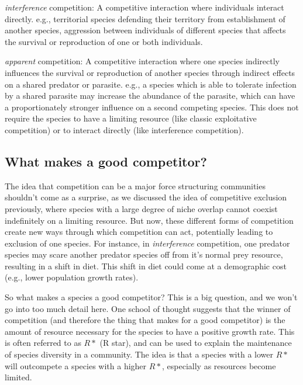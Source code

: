 \documentclass[12pt]{article}
\begin{document}
\textit{interference} competition: A competitive interaction where individuals interact directly. e.g., territorial species defending their territory from establishment of another species, aggression between individuals of different species that affects the survival or reproduction of one or both individuals. 


\textit{apparent} competition: A competitive interaction where one species indirectly influences the survival or reproduction of another species through indirect effects on a shared predator or parasite. e.g., a species which is able to tolerate infection by a shared parasite may increase the abundance of the parasite, which can have a proportionately stronger influence on a second competing species. This does not require the species to have a limiting resource (like classic exploitative competition) or to interact directly (like interference competition). 












\subsection*{What makes a good competitor?}
The idea that competition can be a major force structuring communities shouldn't come as a surprise, as we discussed the idea of competitive exclusion previously, where species with a large degree of niche overlap cannot coexist indefinitely on a limiting resource. But now, these different forms of competition create new ways through which competition can act, potentially leading to exclusion of one species. For instance, in \textit{interference} competition, one predator species may scare another predator species off from it's normal prey resource, resulting in a shift in diet. This shift in diet could come at a demographic cost (e.g., lower population growth rates). 

So what makes a species a good competitor? This is a big question, and we won't go into too much detail here. One school of thought suggests that the winner of competition (and therefore the thing that makes for a good competitor) is the amount of resource necessary for the species to have a positive growth rate. This is often referred to as $R*$ (R star), and can be used to explain the maintenance of species diversity in a community. The idea is that a species with a lower $R*$ will outcompete a species with a higher $R*$, especially as resources become limited. 
\end{document}
